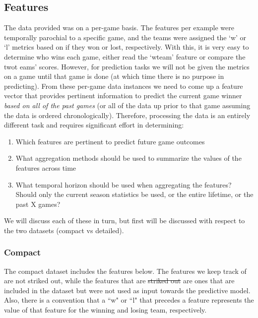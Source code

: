 \documentclass{article} %
\begin{document}
\subsection{Features}
\label{sec:data-features}

The data provided was on a per-game basis.  The features per example were temporally parochial to a specific game, and the teams were assigned the `w' or `l' metrics based on if they won or lost, respectively.  With this, it is very easy to determine who wins each game, either read the `wteam' feature or compare the twot eams' scores.  However, for prediction tasks we will not be given the metrics on a game until that game is done (at which time there is no purpose in predicting).  From these per-game data instances we need to come up a feature vector that provides pertinent information to predict the current game winner \textit{based on all of the past games} (or all of the data up prior to that game assuming the data is ordered chronologically).  Therefore, processing the data is an entirely different task and requires significant effort in determining:

\begin{enumerate}
  \item \label{itm:features-pertinent} Which features are pertinent to predict future game outcomes
  \item \label{itm:features-aggregate} What aggregation methods should be used to summarize the values of the features across time
  \item \label{itm:features-horizon} What temporal horizon should be used when aggregating the features?  Should only the current season statistics be used, or the entire lifetime, or the past X games?
\end{enumerate}

We will discuss each of these in turn, but first \label{itm:features-pertinent} will be discussed with respect to the two datasets (compact vs detailed).


\subsubsection{Compact}
\label{sec:data-features-compact}

The compact dataset includes the features below.  The features we keep track of are not striked out, while the features that are \sout{striked out} are ones that are included in the dataset but were not used as input towards the predictive model.  Also, there is a convention that a ``w" or ``l" that precedes a feature represents the value of that feature for the winning and losing team, respectively.
\end{document}

